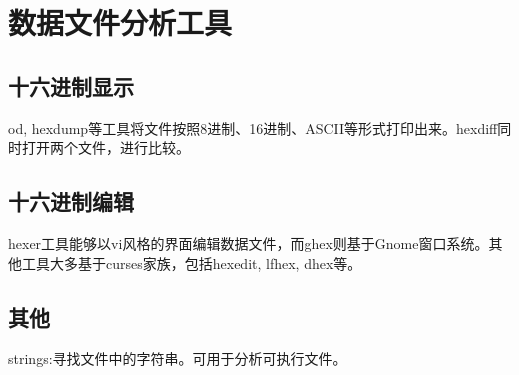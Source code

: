 
\section{数据文件分析工具}

\subsection{十六进制显示}

od, hexdump等工具将文件按照8进制、16进制、ASCII等形式打印出来。hexdiff同时打开两个文件，进行比较。

\subsection{十六进制编辑}
hexer工具能够以vi风格的界面编辑数据文件，而ghex则基于Gnome窗口系统。其他工具大多基于curses家族，包括hexedit, lfhex, dhex等。

\subsection{其他}

strings:寻找文件中的字符串。可用于分析可执行文件。
